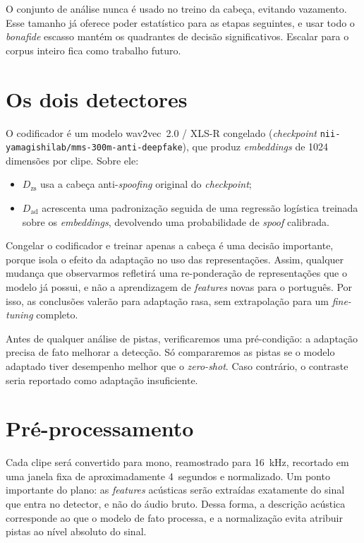 \documentclass[11pt,a4paper]{article}
\begin{document}
O conjunto de análise nunca é usado no treino da cabeça, evitando vazamento. Esse
tamanho já oferece poder estatístico para as etapas seguintes, e usar todo o
\emph{bonafide} escasso mantém os quadrantes de decisão significativos. Escalar
para o corpus inteiro fica como trabalho futuro.

\section{Os dois detectores}

O codificador é um modelo wav2vec~2.0 / XLS-R congelado (\emph{checkpoint}
\texttt{nii-yamagishilab/\allowbreak mms-300m-\allowbreak anti-deepfake}), que
produz \emph{embeddings} de 1024 dimensões por clipe. Sobre ele:

\begin{itemize}
  \item $D_{\mathrm{zs}}$ usa a cabeça anti-\emph{spoofing} original do
        \emph{checkpoint};
  \item $D_{\mathrm{ad}}$ acrescenta uma padronização seguida de uma regressão
        logística treinada sobre os \emph{embeddings}, devolvendo uma
        probabilidade de \emph{spoof} calibrada.
\end{itemize}

Congelar o codificador e treinar apenas a cabeça é uma decisão importante, porque
isola o efeito da adaptação no uso das representações. Assim, qualquer mudança que
observarmos refletirá uma re-ponderação de representações que o modelo já possui,
e não a aprendizagem de \emph{features} novas para o português. Por isso, as
conclusões valerão para adaptação rasa, sem extrapolação para um \emph{fine-tuning}
completo.

Antes de qualquer análise de pistas, verificaremos uma pré-condição: a adaptação
precisa de fato melhorar a detecção. Só compararemos as pistas se o modelo
adaptado tiver desempenho melhor que o \emph{zero-shot}. Caso contrário, o
contraste seria reportado como adaptação insuficiente.

\section{Pré-processamento}

Cada clipe será convertido para mono, reamostrado para 16~kHz, recortado em uma
janela fixa de aproximadamente 4~segundos e normalizado. Um ponto importante do
plano: as \emph{features} acústicas serão extraídas exatamente do sinal que entra
no detector, e não do áudio bruto. Dessa forma, a descrição acústica corresponde
ao que o modelo de fato processa, e a normalização evita atribuir pistas ao nível
absoluto do sinal.
\end{document}
